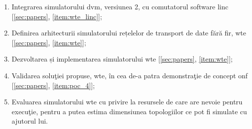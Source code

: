 \begin{enumerate}
	\item Integrarea simulatorului \gls{dvm}, versiunea 2, cu comutatorul software \gls{linc} [\ref{sec:papers}, \ref{item:wte_linc}];
	
	\item Definirea arhitecturii simulatorului rețelelor de transport de date fără fir, \gls{wte} [\ref{sec:papers}, \ref{item:wte}];
	
	\item Dezvoltarea și implementarea simulatorului \gls{wte} [\ref{sec:papers}, \ref{item:wte}];
	
	\item Validarea soluţiei propuse, \gls{wte}, în cea de-a patra demonstraţie de concept \gls{onf} [\ref{sec:papers}, \ref{item:poc_4}];
	
	\item Evaluarea simulatorului \gls{wte} cu privire la resursele de care are nevoie pentru execuţie, pentru a putea estima dimensiunea topologiilor ce pot fi simulate cu ajutorul lui.
\end{enumerate}